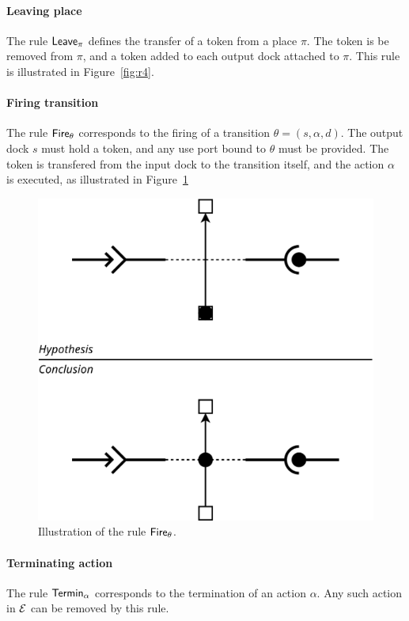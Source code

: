 {\begin{figure}[t]
\begin{minipage}[h]{0.45\columnwidth}
\end{minipage}
\end{figure}

\paragraph{Leaving place}{
  
The rule $\mathsf{Leave}_\pi$ defines the transfer of a token from a place
$\pi$. The token is be removed from $\pi$, and a token added to each
output dock attached to $\pi$. This rule is illustrated in
Figure~\ref{fig:r4}.

}

\paragraph{Firing transition}{

The rule $\mathsf{Fire}_\theta$ corresponds to the firing of a transition
$\theta = (s, \alpha, d)$. The output dock $s$ must hold a token, and
any use port bound to $\theta$ must be provided. The token is
transfered from the input dock to the transition itself, and the
action $\alpha$ is executed, as illustrated in Figure~\ref{fig:r1}

\begin{figure}[t]
\begin{center}
  \includegraphics[width=0.55\columnwidth]{./images/firing.pdf}
\end{center}
\caption{Illustration of the rule $\mathsf{Fire}_\theta$.}
\label{fig:r1}
\end{figure}

}

\paragraph{Terminating action}{
  The rule $\mathsf{Termin}_\alpha$ corresponds to the termination of an action
  $\alpha$. Any such action in $\mathcal{E}$ can be removed by this rule.
}

}
